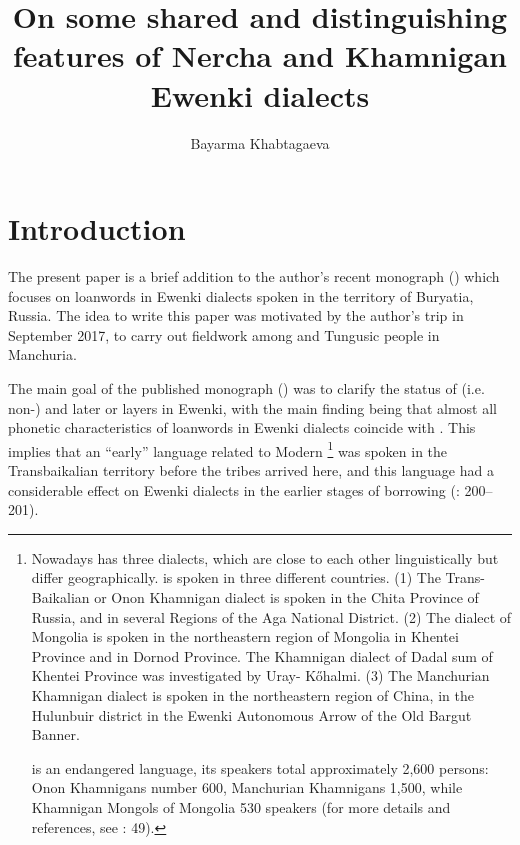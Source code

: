 \documentclass[output=paper,colorlinks,citecolor=brown]{langscibook}
\author{Bayarma Khabtagaeva\affiliation{University of Naples L’Orientale, Department of Asian, African and Mediterranian Studies}}
\title{On some shared and distinguishing features of Nercha and Khamnigan Ewenki dialects}
\begin{document}
\maketitle

\section{Introduction}

The present paper is a brief addition to the author’s recent monograph (\citealt{Khabtagaeva2017}) which focuses on  loanwords in Ewenki dialects spoken in the territory of Buryatia, Russia. The idea to write this paper was motivated by the author’s trip in September 2017, to carry out fieldwork among  and Tungusic people in Manchuria.

The main goal of the published monograph (\citealt{Khabtagaeva2017}) was to clarify the status of  (i.e. non-) and later  or  layers in Ewenki, with the main finding being that almost all phonetic characteristics of  loanwords in Ewenki dialects coincide with . This implies that an “early”  language related to Modern \footnote{Nowadays  has three dialects, which are close to each other linguistically but differ geographically.  is spoken in three different countries. (1) The Trans-Baikalian or Onon Khamnigan dialect is spoken in the Chita Province of Russia, and in several Regions of the  Aga National District. (2) The  dialect of Mongolia is spoken in the northeastern region of Mongolia in Khentei Province and in Dornod Province. The Khamnigan dialect of Dadal sum of Khentei Province was investigated by Uray- Kőhalmi. (3) The Manchurian Khamnigan dialect is spoken in the northeastern region of China, in the Hulunbuir district in the Ewenki Autonomous Arrow of the Old Bargut Banner.

 is an endangered  language, its speakers total approximately 2,600 persons: Onon Khamnigans number 600, Manchurian Khamnigans 1,500, while Khamnigan Mongols of Mongolia 530 speakers (for more details and references, see \citealt{Khabtagaeva2017}: 49).} was spoken in the Transbaikalian territory before the  tribes arrived here, and this language had a considerable effect on Ewenki dialects in the earlier stages of borrowing (\citealt{Khabtagaeva2017}: 200--201).
\end{document}
